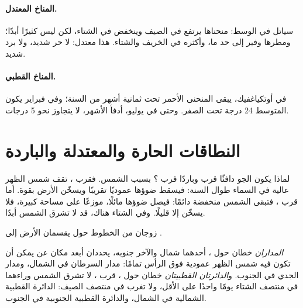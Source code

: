 \paragraph{المناخ المعتدل.} سياتل في الوسط: منحناها يرتفع
في الصيف وينخفض في الشتاء، لكن ليس كثيرًا أبدًا؛ ومطرها وفير إلى حد ما،
وأكثره في الخريف والشتاء. هذا  معتدل: لا حر شديد،
ولا برد شديد.

\paragraph{المناخ القطبي.} في أوتكياغفيك، يبقى المنحنى الأحمر تحت
 ثمانية أشهر من السنة؛ وفي فبراير يكون المتوسط
24 درجة تحت الصفر. وحتى في يوليو، أدفأ الأشهر، لا يتجاوز نحو
5 درجات.

\section{النطاقات الحارة والمعتدلة والباردة}

لماذا يكون الجو دافئًا قرب  وباردًا قرب ؟ بسبب
الشمس. فقرب ، تقف شمس الظهر عالية في السماء طوال
السنة: فيسقط ضوؤها عموديًا تقريبًا ويسخّن الأرض بقوة.
أما قرب ، فتبقى الشمس منخفضة دائمًا: فيصل ضوؤها مائلًا،
موزعًا على مساحة كبيرة، فلا يسخّن إلا قليلًا. وفي الشتاء هناك، قد لا تشرق
الشمس أبدًا.

زوجان من الخطوط حول  يقسمان الأرض إلى .

\begin{definition}\label{def:g5:weather-and-climate:tropics}
\emph{المداران} خطان حول ، أحدهما شمال
 والآخر جنوبه، يحددان أبعد مكان عن  يمكن أن تكون فيه
شمس الظهر عمودية فوق الرأس تمامًا: مدار السرطان في الشمال،
ومدار الجدي في الجنوب. و\emph{الدائرتان
القطبيتان} خطان حول ، قرب
، لا تشرق الشمس وراءهما في منتصف الشتاء يومًا واحدًا على
الأقل، ولا تغرب في منتصف الصيف: الدائرة القطبية الشمالية
في الشمال، والدائرة القطبية الجنوبية في الجنوب.
\end{definition}

